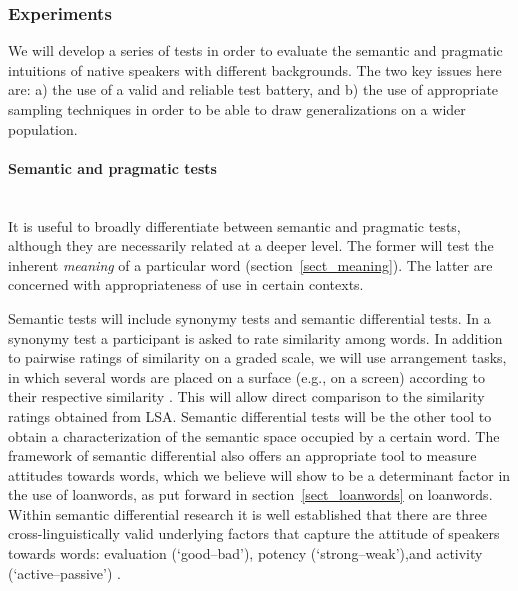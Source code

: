 \documentclass[a4paper]{article}
\begin{document}
\subsubsection{Experiments}
\label{subsect_experim}

We will develop a series of tests in order to evaluate the semantic and pragmatic intuitions of native speakers with different backgrounds.
The two key issues here are: a) the use of a valid and reliable test battery, and b) the use of appropriate sampling techniques in order to be able to draw generalizations on a wider population.

\paragraph{ Semantic and pragmatic tests}
\hspace{0pt} \\
It is useful to broadly differentiate between semantic and pragmatic tests, although they are necessarily related at a deeper level.
The former will test the inherent \emph{meaning} of a particular word (section~\ref{sect_meaning}). 
The latter are concerned with appropriateness of use in certain contexts.

Semantic tests will include synonymy tests and semantic differential tests.
In a synonymy test a participant is asked to rate similarity among words.
In addition to pairwise ratings of similarity on a graded scale, we will use arrangement tasks, in which several words are placed on a surface (e.g., on a screen) according to their respective similarity \citep{Goldstone1994, Kriegeskorte2012}.
This will allow direct comparison to the similarity ratings obtained from LSA.
Semantic differential tests \citep{Osgood1957} will be the other tool to obtain a characterization of the semantic space occupied by a certain word.
The framework of semantic differential also offers an appropriate tool to measure attitudes towards words, which we believe will show to be a determinant factor in the use of loanwords, as put forward in section~\ref{sect_loanwords} on loanwords.
Within semantic differential research it is well established that there are three cross-linguistically valid underlying factors that capture the attitude of speakers towards words: evaluation (`good--bad'), potency (`strong--weak'),and activity (`active--passive') \citep[see][]{Heise2010}.
\end{document}
